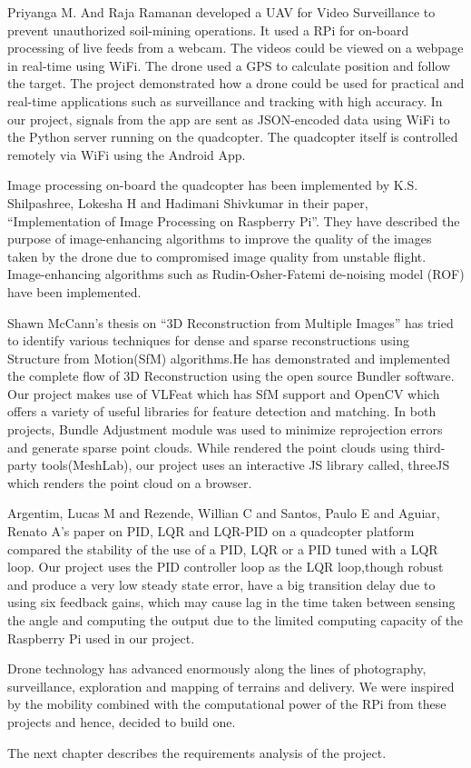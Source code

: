 \par
 Priyanga M. And Raja Ramanan \cite{proc-disc-2009} developed a UAV for Video Surveillance to prevent unauthorized soil-mining operations. It used a RPi for on-board processing of live feeds from a webcam. The videos could be viewed on a webpage in real-time using WiFi. The drone used a GPS to calculate position and follow the target. The project demonstrated how a drone could be used for practical and real-time applications such as surveillance and tracking with high accuracy. 
\newline
 In our project, signals from the app are sent as JSON-encoded data using WiFi to the Python server running on the quadcopter. The quadcopter itself is controlled remotely via WiFi using the Android App.
\par
Image processing on-board the quadcopter has been implemented by K.S. Shilpashree, Lokesha H and Hadimani Shivkumar \cite{ijarcce-disc-2015} in their paper, “Implementation of Image Processing on Raspberry Pi”. They have described the purpose of  image-enhancing algorithms to improve the quality of the images taken by the drone due to compromised image quality from unstable flight. Image-enhancing algorithms such as Rudin-Osher-Fatemi de-noising model (ROF) have been implemented. 
\par
Shawn McCann's thesis on “3D Reconstruction from Multiple Images” \cite{stan-disc-2015} has tried to identify various techniques for dense and sparse reconstructions using Structure from Motion(SfM) algorithms.He has demonstrated and implemented the complete flow of 3D Reconstruction using the open source Bundler software. Our project makes use of VLFeat which has SfM support and OpenCV which offers a variety of useful libraries for feature detection and matching. 
\newline
In both projects, Bundle Adjustment module was used to minimize reprojection errors and generate sparse point clouds. While \cite{stan-disc-2015} rendered the point clouds using third-party tools(MeshLab), our project uses an interactive JS library called, threeJS which renders the point cloud on a browser.
\par
Argentim, Lucas M and Rezende, Willian C and Santos, Paulo E and Aguiar, Renato A's paper on PID, LQR and LQR-PID on a quadcopter platform \cite{argentim2013pid} compared the stability of the use of a PID, LQR or a PID tuned with a LQR loop. Our project uses the PID controller loop as the LQR loop,though robust and produce a very low steady state error, have a big transition delay due to using six feedback gains, which may cause lag in the time taken between sensing the angle and computing the output due to the limited computing capacity of the Raspberry Pi used in our project.
\par
Drone technology has advanced enormously along the lines of photography, surveillance, exploration and mapping of terrains and delivery. We were inspired by the mobility combined with the computational power of the RPi from these projects and hence, decided to build one.
\par
The next chapter describes the requirements analysis of the project.
